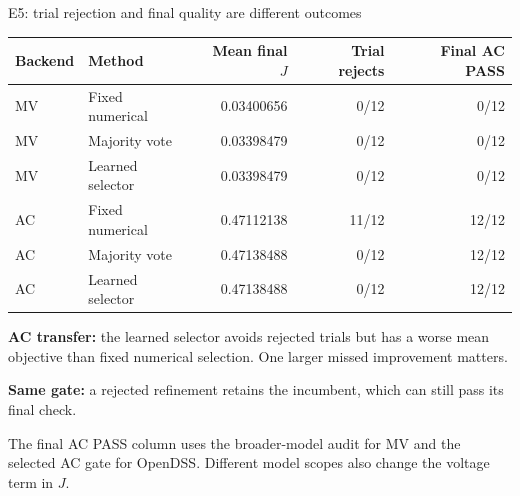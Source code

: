 \begin{frame}[t]{E5: trial rejection and final quality are different outcomes}
\deepdive

\fontsize{8.7}{10.2}\selectfont
\begin{tabular}{@{}llrrr@{}}\toprule Backend & Method & Mean final $J$ & Trial rejects & Final AC PASS \\ \midrule
MV & Fixed numerical & 0.03400656 & 0/12 & 0/12 \\
MV & Majority vote & 0.03398479 & 0/12 & 0/12 \\
MV & Learned selector & 0.03398479 & 0/12 & 0/12 \\
AC & Fixed numerical & 0.47112138 & 11/12 & 12/12 \\
AC & Majority vote & 0.47138488 & 0/12 & 12/12 \\
AC & Learned selector & 0.47138488 & 0/12 & 12/12 \\

\bottomrule\end{tabular}\par\medskip
\textbf{AC transfer:} the learned selector avoids rejected trials but has a worse mean objective than fixed numerical selection. One larger missed improvement matters.\par\medskip
\textbf{Same gate:} a rejected refinement retains the incumbent, which can still pass its final check.\par\medskip
The final AC PASS column uses the broader-model audit for MV and the selected AC gate for OpenDSS. Different model scopes also change the voltage term in $J$.

\end{frame}

